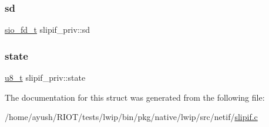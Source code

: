 \subsubsection{\texorpdfstring{sd}{sd}}
{\footnotesize\ttfamily \hyperlink{native_2lwip_2src_2include_2lwip_2sio_8h_ac868e938508a529a77cdc81a6765bd0b}{sio\+\_\+fd\+\_\+t} slipif\+\_\+priv\+::sd}

\mbox{\label{structslipif__priv_a60d119227767d9c015e181d4bb20290a}} 
\subsubsection{\texorpdfstring{state}{state}}
{\footnotesize\ttfamily \hyperlink{group__compiler__abstraction_ga4caecabca98b43919dd11be1c0d4cd8e}{u8\+\_\+t} slipif\+\_\+priv\+::state}



The documentation for this struct was generated from the following file\+:\begin{DoxyCompactItemize}
\item 
/home/ayush/\+R\+I\+O\+T/tests/lwip/bin/pkg/native/lwip/src/netif/\hyperlink{native_2lwip_2src_2netif_2slipif_8c}{slipif.\+c}\end{DoxyCompactItemize}
